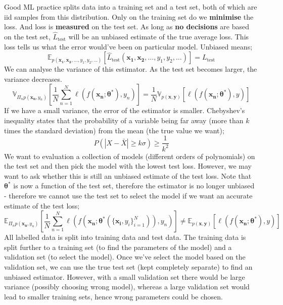 \documentclass[a4paper, 12pt]{article}
\newcommand{\summation}[2]{\sum\limits_{#1}^{#2}}
\renewcommand{\vec}[1]{\boldsymbol{#1}}
\begin{document}
            Good ML practice splits data into a training set and a test set, both of which are iid samples from this distribution.
            Only on the training set do we \textbf{minimise} the loss.
            And loss is \textbf{measured} on the test set.
            As long as \textbf{no decisions} are based on the test set, $\hat{L}_\text{test}$ will be an unbiased estimate of the true average loss.
            This loss tells us what the error would've been on particular model.
            Unbiased means;
            $$\mathbb{E}_{p(\vec{x_1}, \vec{x_2}, \dots, y_1, y_2, \dots)}[\hat{L}_\text{test}(\vec{x_1}, \vec{x_2}, \dots, y_1, y_2, \dots)] = L_\text{test}$$
            We can analyse the variance of this estimator.
            As the test set becomes larger, the variance decreases.
            $$\mathbb{V}_{\Pi_n p(\vec{x_n}, y_n)} \left[\frac{1}{N} \summation{n = 1}{N} \ell(f(\vec{x_n}; \vec{\theta^*}), y_n)\right] = \frac{1}{N} \mathbb{V}_{p(\vec{x}, \vec{y})}[\ell(f(\vec{x_n}; \vec{\theta^*}), y)]$$
            If we have a small variance, the error of the estimator is smaller.
            Chebyshev's inequality states that the probability of a variable being far away (more than $k$ times the standard deviation) from the mean (the true value we want);
            $$P(| X - \bar{X} | \geq k\sigma) \geq \frac{1}{k^2}$$
            We want to evaluation a collection of models (different orders of polynomials) on the test set and then pick the model with the lowest test loss.
            However, we may want to ask whether this is still an unbiased estimate of the test loss.
            Note that $\vec{\theta^*}$ is now a function of the test set, therefore the estimator is no longer unbiased - therefore we cannot use the test set to select the model if we want an accurate estimate of the test loss;
            $$\mathbb{E}_{\Pi_n p(\vec{x_n}, y_n)} \left[\frac{1}{N} \summation{n = 1}{N} \ell(f(\vec{x_n}; \vec{\theta^*}(\{\vec{x_i}, y_i\}_{i = 1}^N)), y_n)\right] \neq \mathbb{E}_{p(\vec{x}, \vec{y})}[\ell(f(\vec{x_n}; \vec{\theta^*}), y)]$$
            All labelled data is split into training data and test data.
            The training data is split further to a training set (to find the parameters of the model) and a validation set (to select the model).
            Once we've select the model based on the validation set, we can use the true test set (kept completely separate) to find an unbiased estimator.
            However, with a small validation set there would be large variance (possibly choosing wrong model), whereas a large validation set would lead to smaller training sets, hence wrong parameters could be chosen.
            \medskip
\end{document}
